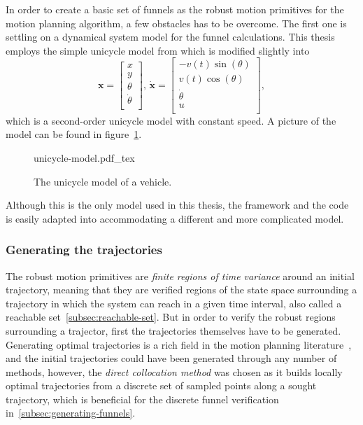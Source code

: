 In order to create a basic set of funnels as the robust motion primitives for
the \rrtfunnel{} motion planning algorithm, a few obstacles has to be overcome.
The first one is settling on a dynamical system model for the funnel
calculations. This thesis employs the simple unicycle model from
\cite[LaValle.p~613]{Lav06} which is modified slightly into
\begin{equation}
  \label{eq:model-dynamics}
  \mathbf{x} =
  \begin{bmatrix}
    x \\ y \\ \theta \\ \dot{\theta} \\
  \end{bmatrix}, \, \dot{\mathbf{x}} =
  \begin{bmatrix}
    -v(t)\sin(\theta) \\
    v(t)\cos(\theta) \\
    \dot{\theta} \\
    u \\
  \end{bmatrix},
\end{equation}
which is a second-order unicycle model with constant speed. A picture of the
model can be found in figure~\ref{fig:second-order-unicycle}.
\begin{figure}
  \centering
  {
    \fontsize{16pt}{16pt}\selectfont
    \def\svgwidth{1.333in}
    {unicycle-model.pdf_tex}
  }
  \caption{The unicycle model of a vehicle.}
  \label{fig:second-order-unicycle}
\end{figure}
Although this is the only model used in this thesis, the framework and the code
is easily adapted into accommodating a different and more complicated model.

\subsubsection{Generating the trajectories}

The robust motion primitives are \textit{finite regions of time variance} around
an initial trajectory, meaning that they are verified regions of the state space
surrounding a trajectory in which the system can reach in a given time interval,
also called a reachable set~\ref{subsec:reachable-set}. But in order to verify
the robust regions surrounding a trajector, first the trajectories themselves
have to be generated. Generating optimal trajectories is a rich field in the
motion planning literature~\cite{bettsSurveyNumericalMethods}, and the initial
trajectories could have been generated through any number of methods, however,
the \textit{direct collocation method} was chosen as it builds locally optimal
trajectories from a discrete set of sampled points along a sought trajectory,
which is beneficial for the discrete funnel verification
in~\ref{subsec:generating-funnels}.

